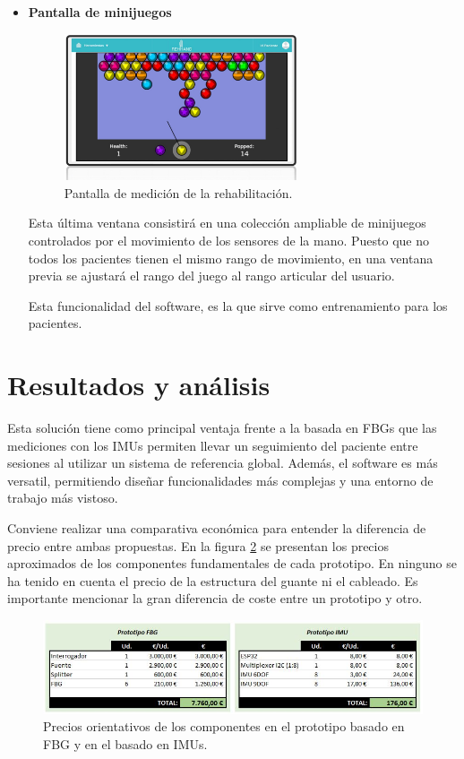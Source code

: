 \begin{itemize}
	
	
	\item \textbf{Pantalla de minijuegos}
	
	\begin{figure}[H]
		\centering
		\includegraphics[width=0.65\textwidth]{./img/softwareIMU3}
		\caption{Pantalla de medición de la rehabilitación. } 
		\label{fig:softIMU3}
	\end{figure} 
	
	Esta última ventana consistirá en una colección ampliable de minijuegos controlados por el movimiento de los sensores de la mano. Puesto que no todos los pacientes tienen el mismo rango de movimiento, en una ventana previa se ajustará el rango del juego al rango articular del usuario.
	
	Esta funcionalidad del software, es la que sirve como entrenamiento para los pacientes. 
	
	
\end{itemize}




\section{Resultados y análisis}
\label{sec:resultados4}

   
	
	Esta solución tiene como principal ventaja frente a la basada en FBGs que las mediciones con los IMUs permiten llevar un seguimiento del paciente entre sesiones al utilizar un sistema de referencia global. Además, el software es más versatil, permitiendo diseñar funcionalidades más complejas y una entorno de trabajo más vistoso.
 
	
	Conviene realizar una comparativa económica para entender la diferencia de precio entre ambas propuestas. En la figura \ref{fig:precioCompara} se presentan los precios aproximados de los componentes fundamentales de cada prototipo. En ninguno se ha tenido en cuenta el precio de la estructura del guante ni el cableado. Es importante mencionar la gran diferencia de coste entre un prototipo y otro.
	
	\begin{figure}[H]
		\centering
		\includegraphics[width=\textwidth]{./img/precios2}
		\caption{Precios orientativos de los componentes en el prototipo basado en FBG y en el basado en IMUs. } 
		\label{fig:precioCompara}
	\end{figure} 
	
	
	